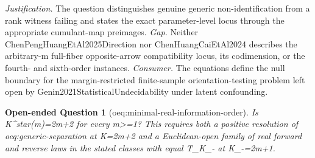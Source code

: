 \documentclass{article}
\newtheorem{openendedquestion}{Open-ended Question}
\begin{document}
\par\smallskip\noindent \textit{Justification.} The question distinguishes genuine generic non-identification from a rank witness failing and states the exact parameter-level locus through the appropriate cumulant-map preimages. \textit{Gap.} Neither ChenPengHuangEtAl2025Direction nor ChenHuangCaiEtAl2024 describes the arbitrary-m full-fiber opposite-arrow compatibility locus, its codimension, or the fourth- and sixth-order instances. \textit{Consumer.} The equations define the null boundary for the margin-restricted finite-sample orientation-testing problem left open by Genin2021StatisticalUndecidability under latent confounding.

\begin{openendedquestion}[oeq:minimal-real-information-order]\label{oeq:minimal-real-information-order}
Is K^star(m)=2m+2 for every m>=1? This requires both a positive resolution of oeq:generic-separation at K=2m+2 and a Euclidean-open family of real forward and reverse laws in the stated classes with equal T_{K_-} at K_-=2m+1.
\end{openendedquestion}
\end{document}
